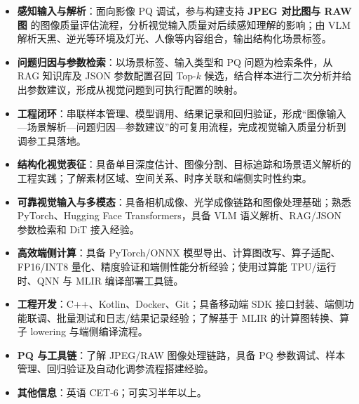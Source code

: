 \begin{itemize}
  \item \textbf{感知输入与解析}：面向影像 PQ 调试，参与构建支持 \textbf{JPEG 对比图与 RAW 图} 的图像质量评估流程，分析视觉输入质量对后续感知理解的影响；由 VLM 解析天黑、逆光等环境及灯光、人像等内容组合，输出结构化场景标签。
  \item \textbf{问题归因与参数检索}：以场景标签、输入类型和 PQ 问题为检索条件，从 RAG 知识库及 JSON 参数配置召回 Top-$k$ 候选，结合样本进行二次分析并给出参数建议，形成从视觉问题到可执行配置的映射。
  \item \textbf{工程闭环}：串联样本管理、模型调用、结果记录和回归验证，形成“图像输入—场景解析—问题归因—参数建议”的可复用流程，完成视觉输入质量分析到调参工具落地。
\end{itemize}

\begin{itemize}
  \item \textbf{结构化视觉表征}：具备单目深度估计、图像分割、目标追踪和场景语义解析的工程实践；了解素材区域、空间关系、时序关联和端侧实时性约束。
  \item \textbf{可靠视觉输入与多模态}：具备相机成像、光学成像链路和图像处理基础；熟悉 PyTorch、Hugging Face Transformers，具备 VLM 语义解析、RAG/JSON 参数检索和 DiT 接入经验。
  \item \textbf{高效端侧计算}：具备 PyTorch/ONNX 模型导出、计算图改写、算子适配、FP16/INT8 量化、精度验证和端侧性能分析经验；使用过算能 TPU/运行时、QNN 与 MLIR 编译部署工具链。
  \item \textbf{工程开发}：C++、Kotlin、Docker、Git；具备移动端 SDK 接口封装、端侧功能联调、批量测试和日志/结果记录经验；了解基于 MLIR 的计算图转换、算子 lowering 与端侧编译流程。
  \item \textbf{PQ 与工具链}：了解 JPEG/RAW 图像处理链路，具备 PQ 参数调试、样本管理、回归验证及自动化调参流程搭建经验。
  \item \textbf{其他信息}：英语 CET-6；可实习半年以上。
\end{itemize}
